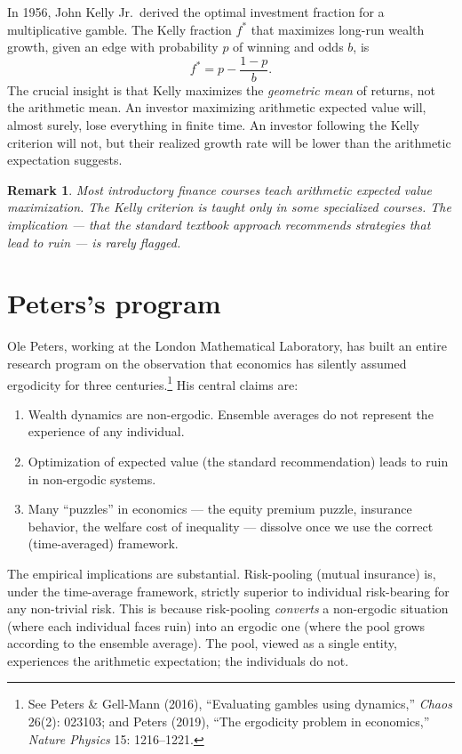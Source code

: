 \documentclass[11pt,a4paper]{book}
\theoremstyle{cleanrm}
\newtheorem{remark}{Remark}[chapter]
\begin{document}
In 1956, John Kelly Jr.\ derived the optimal investment fraction for
a multiplicative gamble. The Kelly fraction $f^*$ that maximizes
long-run wealth growth, given an edge with probability $p$ of winning
and odds $b$, is
\[
    f^* = p - \frac{1-p}{b}.
\]
The crucial insight is that Kelly maximizes the \emph{geometric mean}
of returns, not the arithmetic mean. An investor maximizing arithmetic
expected value will, almost surely, lose everything in finite time.
An investor following the Kelly criterion will not, but their realized
growth rate will be lower than the arithmetic expectation suggests.

\begin{remark}
Most introductory finance courses teach arithmetic expected value
maximization. The Kelly criterion is taught only in some specialized
courses. The implication --- that the standard textbook approach
recommends strategies that lead to ruin --- is rarely flagged.
\end{remark}

\section{Peters's program}

Ole Peters, working at the London Mathematical Laboratory, has built
an entire research program on the observation that economics has
silently assumed ergodicity for three centuries.\footnote{See Peters
\& Gell-Mann (2016), ``Evaluating gambles using dynamics,'' \emph{Chaos}
26(2): 023103; and Peters (2019), ``The ergodicity problem in
economics,'' \emph{Nature Physics} 15: 1216--1221.} His central
claims are:

\begin{enumerate}[leftmargin=2em]
    \item Wealth dynamics are non-ergodic. Ensemble averages do not
    represent the experience of any individual.
    \item Optimization of expected value (the standard recommendation)
    leads to ruin in non-ergodic systems.
    \item Many ``puzzles'' in economics --- the equity premium puzzle,
    insurance behavior, the welfare cost of inequality --- dissolve
    once we use the correct (time-averaged) framework.
\end{enumerate}

The empirical implications are substantial. Risk-pooling (mutual
insurance) is, under the time-average framework, strictly superior to
individual risk-bearing for any non-trivial risk. This is because
risk-pooling \emph{converts} a non-ergodic situation (where each
individual faces ruin) into an ergodic one (where the pool grows
according to the ensemble average). The pool, viewed as a single
entity, experiences the arithmetic expectation; the individuals do not.
\end{document}
